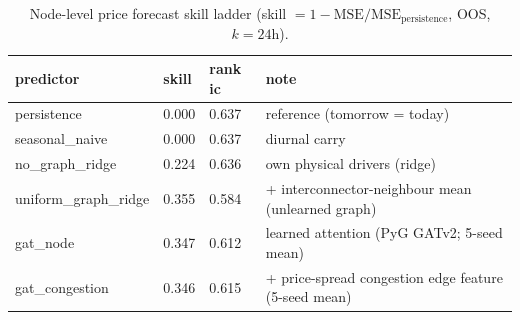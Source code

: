 \begin{table}[htbp]
  \centering
  \small
  \caption{Node-level price forecast skill ladder (skill $=1-\mathrm{MSE}/\mathrm{MSE}_{\mathrm{persistence}}$, OOS, $k=24$h).}
  \label{tab:energy-node-skill}
  \begin{tabular}{lll>{\raggedright\arraybackslash}p{}}
    \toprule
    predictor & skill & rank ic & note \\
    \midrule
    persistence & 0.000 & 0.637 & reference (tomorrow = today) \\
    seasonal\_naive & 0.000 & 0.637 & diurnal carry \\
    no\_graph\_ridge & 0.224 & 0.636 & own physical drivers (ridge) \\
    uniform\_graph\_ridge & 0.355 & 0.584 & + interconnector-neighbour mean (unlearned graph) \\
    gat\_node & 0.347 & 0.612 & learned attention (PyG GATv2; 5-seed mean) \\
    gat\_congestion & 0.346 & 0.615 & + price-spread congestion edge feature (5-seed mean) \\
    \bottomrule
  \end{tabular}
\end{table}
